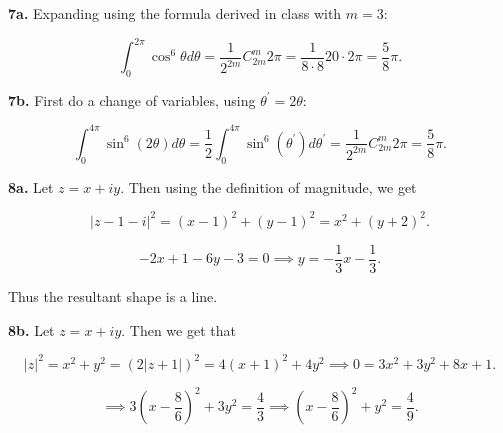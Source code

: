 \documentclass[letterpaper, reqno,11pt]{article}
\begin{document}







{\noindent\bf 7a.} Expanding using the formula derived in class with $m=3$: 

\[
\int_{0}^{2\pi}\cos^{6}\theta d\theta=\frac{1}{2^{2m}}C_{2m}^{m}2\pi=\frac{1}{8\cdot 8}20\cdot 2\pi=\frac{5}{8}\pi
.\] 

{\noindent\bf 7b.} First do a change of variables, using $\theta^\prime=2\theta$:

\[
\int_0^{4\pi}\sin^{6}(2\theta) d\theta=\frac{1}{2}\int_0^{4\pi}\sin^{6}(\theta^\prime) d\theta^\prime=\frac{1}{2^{2m}}C_{2m}^{m}2\pi=\frac{5}{8}\pi
.\] 

{\noindent\bf 8a.} Let $z=x+iy$. Then using the definition of magnitude, we get 

\[
|z-1-i|^2=(x-1)^2+(y-1)^2=x^2+(y+2)^2
.\] 

\[
-2x+1-6y-3=0\implies y=-\frac{1}{3}x-\frac{1}{3}
.\] 

Thus the resultant shape is a line. 

{\noindent\bf 8b.} Let $z=x+iy$. Then we get that 

\[
|z|^2=x^2+y^2=(2|z+1|)^2=4(x+1)^2+4y^2\implies 0=3x^2+3y^2+8x+1
.\] 

\[
\implies 3(x-\frac{8}{6})^2+3y^2=\frac{4}{3}\implies (x-\frac{8}{6})^2+y^2=\frac{4}{9}
.\] 
\end{document}

